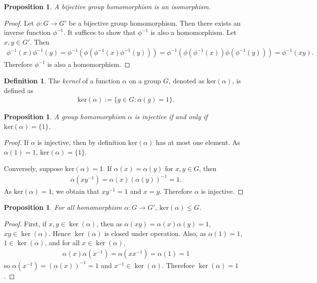 \documentclass[12pt]{report}
\theoremstyle{plain}
\newtheorem{proposition}[theorem]{Proposition}
\theoremstyle{remark}
\theoremstyle{definition}
\newtheorem{definition}[theorem]{Definition}
\begin{document}
\begin{proposition}
    A bijective group homomorphism is an isomorphism.
\end{proposition}
\begin{proof}
    Let $\phi:G\rightarrow G'$ be a bijective group homomorphism. Then there exists an inverse function $\phi^{-1}$. It suffices to show that $\phi^{-1}$ is also a homomorphism. Let $x,y\in G'$. Then
    \begin{align*}
        \phi^{-1}(x)\phi^{-1}(y) = \phi^{-1}(\phi(\phi^{-1}(x)\phi^{-1}(y))) = \phi^{-1}(\phi(\phi^{-1}(x))\phi(\phi^{-1}(y)))=\phi^{-1}(xy).
    \end{align*}
    Therefore $\phi^{-1}$ is also a homomorphism.
\end{proof}

\begin{definition}
    The \emph{kernel} of a function $\alpha$ on a group $G$, denoted as $\mathrm{ker}(\alpha)$, is defined as
    \begin{align*}
        \mathrm{ker}(\alpha) := \{g\in G:\alpha(g) = 1\}.
    \end{align*}
\end{definition}

\begin{proposition}
    A group homomorphism $\alpha$ is injective if and only if $\mathrm{ker}(\alpha)=\{1\}$.
\end{proposition}
\begin{proof}
    If $\alpha$ is injective, then by definition $\mathrm{ker}(\alpha)$ has at most one element. As $\alpha(1) = 1$, $\mathrm{ker}(\alpha)=\{1\}$.

    Conversely, suppose $\mathrm{ker}(\alpha) = 1$. If $\alpha(x)=\alpha(y)$ for $x,y\in G$, then
    \begin{align*}
        \alpha(xy^{-1}) = \alpha(x)(\alpha(y))^{-1}=1.
    \end{align*}
    As $\mathrm{ker}(\alpha)=1$, we obtain that $xy^{-1} = 1$ and $x=y$. Therefore $\alpha$ is injective.
\end{proof}

\begin{proposition}
    For all homomorphism $\alpha:G\rightarrow G'$, $\mathrm{ker}(\alpha)\le G$.
\end{proposition}
\begin{proof}
    First, if $x,y\in\ker(\alpha)$, then as $\alpha(xy)=\alpha(x)\alpha(y) = 1$, $xy\in\ker(\alpha)$. Hence $\ker(\alpha)$ is closed under operation. Also, as $\alpha(1)=1$, $1\in\ker(\alpha)$, and for all $x\in\ker(\alpha)$,
    \begin{align*}
        \alpha(x)\alpha(x^{-1}) = \alpha(xx^{-1}) = \alpha(1) = 1
    \end{align*}
    so $\alpha(x^{-1}) = (\alpha(x))^{-1}=1$ and $x^{-1}\in\ker(\alpha)$. Therefore $\ker(\alpha)=1$.
\end{proof}
\end{document}
